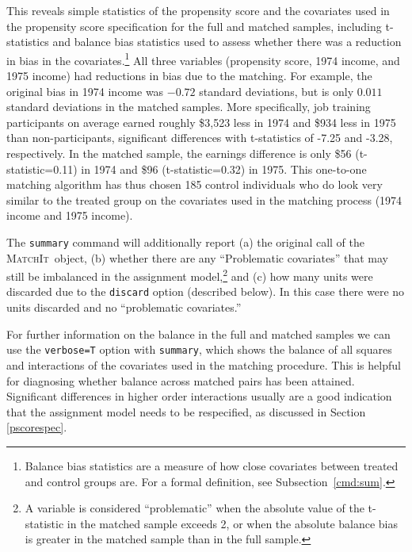 \documentclass[oneside,letterpaper,titlepage]{article}
\newcommand{\MatchIt}{\textsc{MatchIt}}
\begin{document}
This reveals simple statistics of the propensity score and the
covariates used in the propensity score specification for the full and
matched samples, including t-statistics and balance bias statistics
used to assess whether there was a reduction in bias in the
covariates.\footnote{Balance bias statistics are a measure of how
  close covariates between treated and control groups are.  For a
  formal definition, see Subsection~\ref{cmd:sum}.}  All three
variables (propensity score, 1974 income, and 1975 income) had
reductions in bias due to the matching.  For example, the original
bias in 1974 income was $-0.72$ standard deviations, but is only
$0.011$ standard deviations in the matched samples.  More
specifically, job training participants on average earned roughly
\$3,523 less in 1974 and \$934 less in 1975 than non-participants,
significant differences with t-statistics of -7.25 and -3.28,
respectively.  In the matched sample, the earnings difference is only
\$56 (t-statistic=0.11) in 1974 and \$96 (t-statistic=0.32) in 1975.
This one-to-one matching algorithm has thus chosen 185 control
individuals who do look very similar to the treated group on the
covariates used in the matching process (1974 income and 1975 income).

The \texttt{summary} command will additionally report (a) the original
call of the \MatchIt\ object, (b) whether there are any ``Problematic
covariates'' that may still be imbalanced in the assignment
model,\footnote{A variable is considered ``problematic'' when the
  absolute value of the t-statistic in the matched sample exceeds 2,
  or when the absolute balance bias is greater in the matched sample
  than in the full sample.} and (c) how many units were discarded due
to the \texttt{discard} option (described below).  In this case there
were no units discarded and no ``problematic covariates.''

For further information on the balance in the full and matched samples
we can use the {\tt verbose=T} option with {\tt summary}, which
shows the balance of all squares and interactions of the covariates
used in the matching procedure.  This is helpful for diagnosing whether balance across matched
pairs has been attained.  Significant differences in higher order
interactions usually are a good indication that the assignment model
needs to be respecified, as discussed in Section \ref{pscorespec}.
\end{document}
